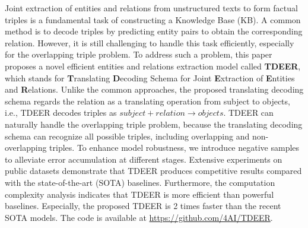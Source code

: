Joint extraction of entities and relations from unstructured texts to form factual triples is a fundamental task of constructing a Knowledge Base (KB). A common method is to decode triples by predicting entity pairs to obtain the corresponding relation. However, it is still challenging to handle this task efficiently, especially for the overlapping triple problem. To address such a problem, this paper proposes a novel efficient entities and relations extraction model called \textbf{TDEER}, which stands for \textbf{T}ranslating \textbf{D}ecoding Schema for Joint \textbf{E}xtraction of \textbf{E}ntities and \textbf{R}elations. Unlike the common approaches, the proposed translating decoding schema regards the relation as a translating operation from subject to objects, i.e., TDEER decodes triples as $subject + relation \rightarrow objects$. TDEER can naturally handle the overlapping triple problem,  because the translating decoding schema can recognize all possible triples, including overlapping and non-overlapping triples. To enhance model robustness, we introduce negative samples to alleviate error accumulation at different stages. Extensive experiments on public datasets demonstrate that TDEER produces competitive results compared with the state-of-the-art (SOTA) baselines. Furthermore, the computation complexity analysis indicates that TDEER is more efficient than powerful baselines. Especially, the proposed TDEER is 2 times faster than the recent SOTA models. The code is available at \url{https://github.com/4AI/TDEER}.
